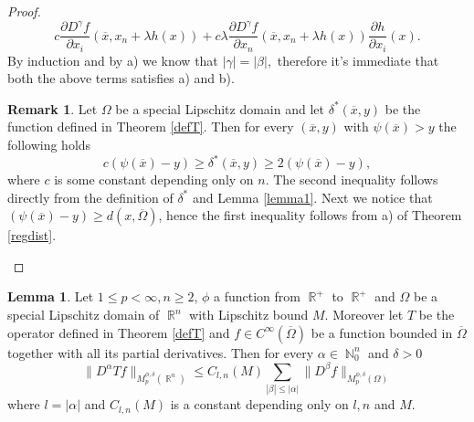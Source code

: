 \documentclass[12pt]{article}
\theoremstyle{definition}
\newtheorem{remark}{Remark}
\newtheorem{lemma}{Lemma}
\DeclareMathOperator\rr{\mathbb{R}}
\DeclareMathOperator\nn{\mathbb{N}}
\begin{document}
\begin{proof}
\[ c \frac{\partial D^{\gamma} f}{\partial x_i} (\overline x, x_n+\lambda h(x)) + c\lambda \frac{\partial D^{\gamma} f}{\partial x_n} (\overline x, x_n+\lambda h(x)) \frac{\partial h}{\partial x_i}(x). \]
By induction and by a) we know that $|\gamma|=|\beta|,$ therefore it's immediate that both the above terms satisfies a) and b).

\begin{remark}\label{deltastar}
Let $\Omega$ be a special Lipschitz domain and let $\delta^*(\overline x, y)$ be the function defined in Theorem \ref{defT}. Then for every $(\overline x, y)$ with $\psi(\overline x)>y$ the following holds
\[c(\psi(\overline x)-y) \ge \delta^*(\overline x, y) \ge 2 (\psi(\overline x)-y), \] 
where $c$ is some constant depending only on $n.$ The second inequality follows directly from the definition of $\delta^*$ and Lemma \ref{lemma1}. Next we notice that $(\psi(\overline x)-y)\ge d(x,\overline \Omega)$, hence the first inequality follows from a) of Theorem \ref{regdist}.
\end{remark}

\end{proof}
\begin{lemma}\label{Tlemma}
Let $1\le p<\infty,n\ge2$, $\phi$ a function from $\rr^+$ to $\rr^+$ and $\Omega$ be a special Lipschitz domain of $\rr^n$ with Lipschitz bound $M.$ Moreover let $T$ be the operator defined in Theorem \ref{defT} and $f \in C^\infty(\overline \Omega)$ be a function bounded in $\overline \Omega$ together with all its partial derivatives. Then  for every $\alpha \in \nn_0^n$ and $\delta>0$
\begin{equation}
 \| D^\alpha Tf\|_{M_p^{\phi,\delta}(\rr^n)}\le C_{l,n}(M)\sum_{|\beta|\le |\alpha|}\|D^\beta f \|_{M_p^{\phi,\delta}(\Omega)} \label{Tbound2}
 \end{equation}
where $l=|\alpha|$ and $C_{l,n}(M)$ is a constant depending only on $l,n$ and $M.$
\end{lemma}
\end{document}
